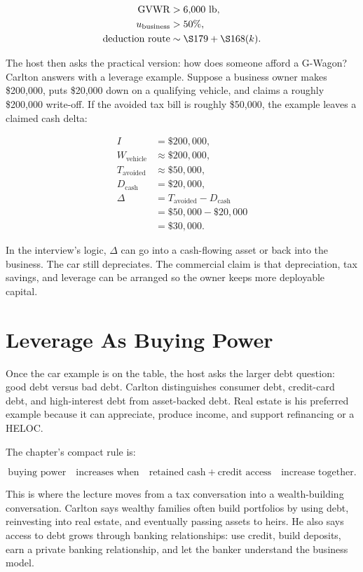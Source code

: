 \begin{align}
\mathrm{GVWR} &> 6{,}000\ \mathrm{lb},\\
u_{\mathrm{business}} &> 50\%,\\
\text{deduction route} &\sim \S 179+\S 168(k).
\end{align}

The host then asks the practical version: how does someone afford a G-Wagon? Carlton answers with a leverage example. Suppose a business owner makes \$200,000, puts \$20,000 down on a qualifying vehicle, and claims a roughly \$200,000 write-off. If the avoided tax bill is roughly \$50,000, the example leaves a claimed cash delta:

\begin{align}
I &= \$200{,}000,\\
W_{\mathrm{vehicle}} &\approx \$200{,}000,\\
T_{\mathrm{avoided}} &\approx \$50{,}000,\\
D_{\mathrm{cash}} &= \$20{,}000,\\
\Delta
&= T_{\mathrm{avoided}}-D_{\mathrm{cash}}\\
&= \$50{,}000-\$20{,}000\\
&= \$30{,}000.
\end{align}

In the interview's logic, \(\Delta\) can go into a cash-flowing asset or back into the business. The car still depreciates. The commercial claim is that depreciation, tax savings, and leverage can be arranged so the owner keeps more deployable capital.

\section{Leverage As Buying Power}

Once the car example is on the table, the host asks the larger debt question: good debt versus bad debt. Carlton distinguishes consumer debt, credit-card debt, and high-interest debt from asset-backed debt. Real estate is his preferred example because it can appreciate, produce income, and support refinancing or a HELOC.

The chapter's compact rule is:

\begin{equation}
\text{buying power}
\quad\text{increases when}\quad
\text{retained cash}
+
\text{credit access}
\quad\text{increase together}.
\end{equation}

This is where the lecture moves from a tax conversation into a wealth-building conversation. Carlton says wealthy families often build portfolios by using debt, reinvesting into real estate, and eventually passing assets to heirs. He also says access to debt grows through banking relationships: use credit, build deposits, earn a private banking relationship, and let the banker understand the business model.

